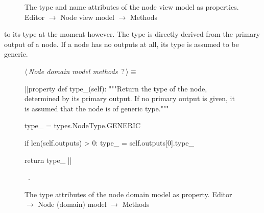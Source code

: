 \documentclass[%
    a4paper,    %
    justified,  %
    nobib,      %
    openany     %
]{tufte-book}
\begin{document}
\begin{figure}
\begin{flushleft}
\begin{minipage}{\linewidth}
\begin{list}{}{\setlength{\itemsep}{-\parsep}\setlength{\itemindent}{-\leftmargin}}
\item{}
\end{list}
\end{minipage}\vspace{4ex}
\end{flushleft}
\caption{The type and name attributes of the node view model as properties.
  \newline{}\newline{}Editor $\rightarrow$ Node view model $\rightarrow$
  Methods}
\label{editor:lst:node-view-model:methods:name}
\end{figure}

 to its type at the moment
however. The type is directly derived from the primary output of a node. If a
node has no outputs at all, its type is assumed to be generic.

\begin{figure}
\begin{flushleft} \small
\begin{minipage}{\linewidth}\label{scrap72}\raggedright\small
{} $\langle\,${\itshape Node domain model methods}\nobreak\ {\footnotesize {?}}$\,\rangle\equiv$
\vspace{-1ex}
\begin{pythoncode}
    |\normalfont{}\fontfamily{}|property
    def type_(self):
        """Return the type of the node, determined by its primary output.
        If no primary output is given, it is assumed that the node is of
        generic type."""

        type_ = types.NodeType.GENERIC

        if len(self.outputs) > 0:
            type_ = self.outputs[0].type_

        return type_
|\NWsep|
\end{pythoncode}
\vspace{1.5ex}
\footnotesize
\begin{list}{}{\setlength{\itemsep}{-\parsep}\setlength{\itemindent}{-\leftmargin}}
\item \NWtxtMacroRefIn\ .

\item{}
\end{list}
\end{minipage}\vspace{4ex}
\end{flushleft}
\caption{The type attributes of the node domain model as property.
  \newline{}\newline{}Editor $\rightarrow$ Node (domain) model $\rightarrow$
  Methods}
\label{editor:lst:node-domain-model:methods:type}
\end{figure}
\end{document}
